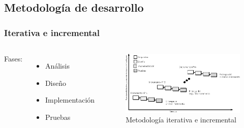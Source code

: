 \documentclass[9pt]{beamer}
\begin{document}
    \subsection{Metodología de desarrollo}
    \begin{frame}
        \frametitle{Iterativa e incremental}
              
        \begin{columns}
            Fases:
            \bigskip
            \begin{itemize}
                \item Análisis
                \item Diseño
                \item Implementación
                \item Pruebas
            \end{itemize}
    
            \begin{figure}
                \includegraphics[width=\textwidth]{assets/iedevelopment-v2.eps}
                \caption{Metodología iterativa e incremental}
            \end{figure}
        \end{columns}
    
    \end{frame}

\end{document}
